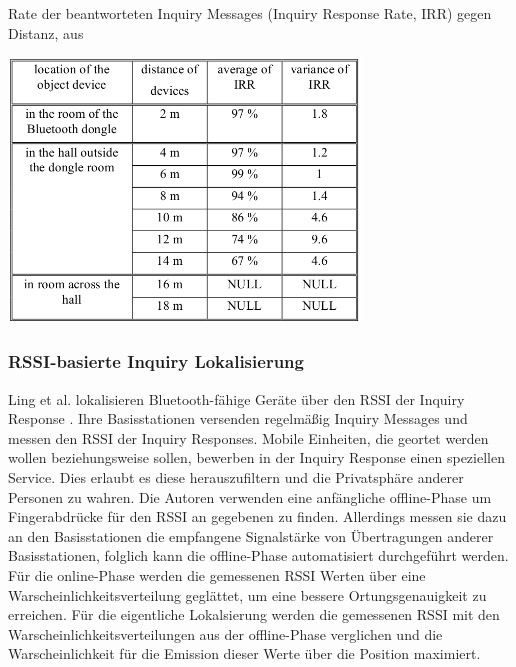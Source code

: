 \begin{table}[h]
  \centering
  \caption{Rate der beantworteten Inquiry Messages (Inquiry Response Rate, IRR) gegen Distanz, aus \cite{bargh2008indoor}}
	\includegraphics[width=0.7\textwidth]{images/irr.png}

  \label{table:irr}
\end{table}

\subsubsection{RSSI-basierte Inquiry Lokalisierung}
Ling et al. lokalisieren Bluetooth-fähige Geräte über den RSSI der Inquiry Response \cite{ling2010inquiry}.
Ihre Basisstationen versenden regelmäßig Inquiry Messages und messen den RSSI der Inquiry Responses.
Mobile Einheiten, die geortet werden wollen beziehungsweise sollen, bewerben in der Inquiry Response einen speziellen Service.
Dies erlaubt es diese herauszufiltern und die Privatsphäre anderer Personen zu wahren.
Die Autoren verwenden eine anfängliche offline-Phase um Fingerabdrücke für den RSSI an gegebenen zu finden.
Allerdings messen sie dazu an den Basisstationen die empfangene Signalstärke von Übertragungen anderer Basisstationen, folglich kann die offline-Phase automatisiert durchgeführt werden.
Für die online-Phase werden die gemessenen RSSI Werten über eine Warscheinlichkeitsverteilung geglättet, um eine bessere Ortungsgenauigkeit zu erreichen.
Für die eigentliche Lokalsierung werden die gemessenen RSSI mit den Warscheinlichkeitsverteilungen aus der offline-Phase verglichen und die Warscheinlichkeit für die Emission dieser Werte über die Position maximiert.

